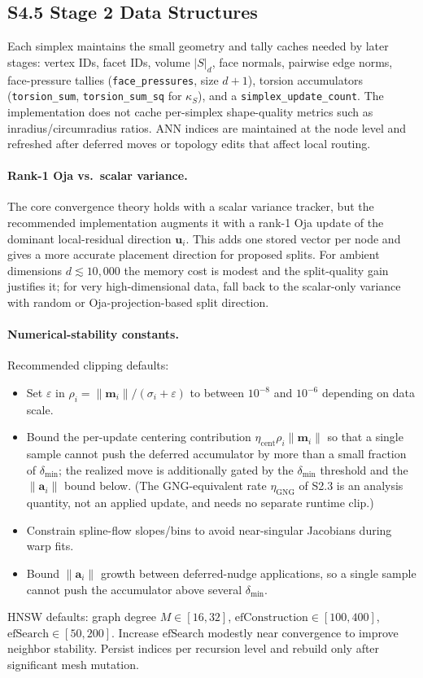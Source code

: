 \documentclass[11pt]{article}
\begin{document}
\subsection*{S4.5 Stage 2 Data Structures}
Each simplex maintains the small geometry and tally caches needed by later stages: vertex IDs, facet IDs, volume $|S|_d$, face normals, pairwise edge norms, face-pressure tallies (\texttt{face\_pressures}, size $d{+}1$), torsion accumulators (\texttt{torsion\_sum}, \texttt{torsion\_sum\_sq} for $\kappa_S$), and a \texttt{simplex\_update\_count}. The implementation does not cache per-simplex shape-quality metrics such as inradius/circumradius ratios. ANN indices are maintained at the node level and refreshed after deferred moves or topology edits that affect local routing.

\paragraph{Rank-1 Oja vs.\ scalar variance.}
The core convergence theory holds with a scalar variance tracker, but the recommended implementation augments it with a rank-1 Oja update of the dominant local-residual direction $\mathbf u_i$. This adds one stored vector per node and gives a more accurate placement direction for proposed splits. For ambient dimensions $d\lesssim 10{,}000$ the memory cost is modest and the split-quality gain justifies it; for very high-dimensional data, fall back to the scalar-only variance with random or Oja-projection-based split direction.

\paragraph{Numerical-stability constants.}
Recommended clipping defaults:
\begin{itemize}[leftmargin=1.5em]
  \item Set $\varepsilon$ in $\rho_i=\|\mathbf m_i\|/(\sigma_i+\varepsilon)$ to between $10^{-8}$ and $10^{-6}$ depending on data scale.
  \item Bound the per-update centering contribution $\eta_{\mathrm{cent}}\rho_i\|\mathbf m_i\|$ so that a single sample cannot push the deferred accumulator by more than a small fraction of $\delta_{\min}$; the realized move is additionally gated by the $\delta_{\min}$ threshold and the $\|\mathbf a_i\|$ bound below. (The GNG-equivalent rate $\eta_{\mathrm{GNG}}$ of S2.3 is an analysis quantity, not an applied update, and needs no separate runtime clip.)
  \item Constrain spline-flow slopes/bins to avoid near-singular Jacobians during warp fits.
  \item Bound $\|\mathbf a_i\|$ growth between deferred-nudge applications, so a single sample cannot push the accumulator above several $\delta_{\min}$.
\end{itemize}
HNSW defaults: graph degree $M\in[16,32]$, $\mathrm{efConstruction}\in[100,400]$, $\mathrm{efSearch}\in[50,200]$. Increase $\mathrm{efSearch}$ modestly near convergence to improve neighbor stability. Persist indices per recursion level and rebuild only after significant mesh mutation.
\end{document}

